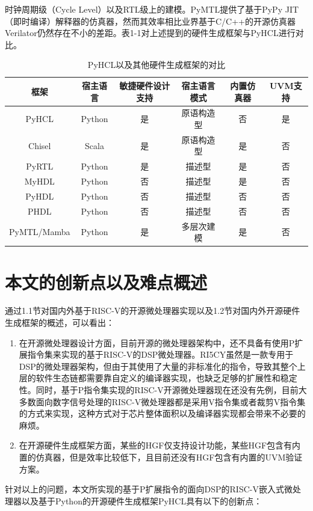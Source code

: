 时钟周期级（Cycle Level）以及RTL级上的建模。PyMTL提供了基于PyPy JIT（即时编译）解释器的仿真器，然而其效率相比业界基于C/C++的开源仿真器Verilator仍然存在不小的差距。表1-1对上述提到的硬件生成框架与PyHCL进行对比。

\begin{table}
	\caption{PyHCL以及其他硬件生成框架的对比}
	\centering
	\small 
	\begin{tabular}{cccccc}
		\hline 
		框架 & 宿主语言                & 敏捷硬件设计支持 & 宿主语言模式 &     内置仿真器 &  UVM支持            \tabularnewline
		\hline 
		PyHCL   & Python		     & 是   & 原语构造型 & 否 & 是 \tabularnewline
		Chisel    & Scala		         & 是   & 原语构造型 & 是 & 否 \tabularnewline
		PyRTL   & Python		     & 是   & 描述型 & 是 & 否 \tabularnewline
		MyHDL   & Python		     & 否   & 描述型 & 是 & 否 \tabularnewline
		PyHDL   & Python		     & 否   & 描述型 & 否 & 否 \tabularnewline
		PHDL   & Python		     & 否   & 描述型 & 否& 否 \tabularnewline
		PyMTL/Mamba   & Python		     & 是   & 多层次建模 & 是 & 否 \tabularnewline
		\hline 
	\end{tabular}
\end{table}

\section{本文的创新点以及难点概述}

通过1.1节对国内外基于RISC-V的开源微处理器实现以及1.2节对国内外开源硬件生成框架的概述，可以看出：

\begin{enumerate}
	\item 在开源微处理器设计方面，目前开源的微处理器架构中，还不具备有使用P扩展指令集来实现的基于RISC-V的DSP微处理器。RI5CY虽然是一款专用于DSP的微处理器架构，但由于其使用了大量的非标准化的指令，导致其整个上层的软件生态链都需要靠自定义的编译器实现，也缺乏足够的扩展性和稳定性。同时，基于P指令集实现的RISC-V开源微处理器现在还没有先例，目前大多数面向数字信号处理的RISC-V微处理器都是采用V指令集或者裁剪V指令集的方式来实现，这种方式对于芯片整体面积以及编译器实现都会带来不必要的麻烦。
	\item 在开源硬件生成框架方面，某些的HGF仅支持设计功能，某些HGF包含有内置的仿真器，但是效率比较低下，且目前还没有HGF包含有内置的UVM验证方案。
\end{enumerate}

针对以上的问题，本文所实现的基于P扩展指令的面向DSP的RISC-V嵌入式微处理器以及基于Python的开源硬件生成框架PyHCL具有以下的创新点：

